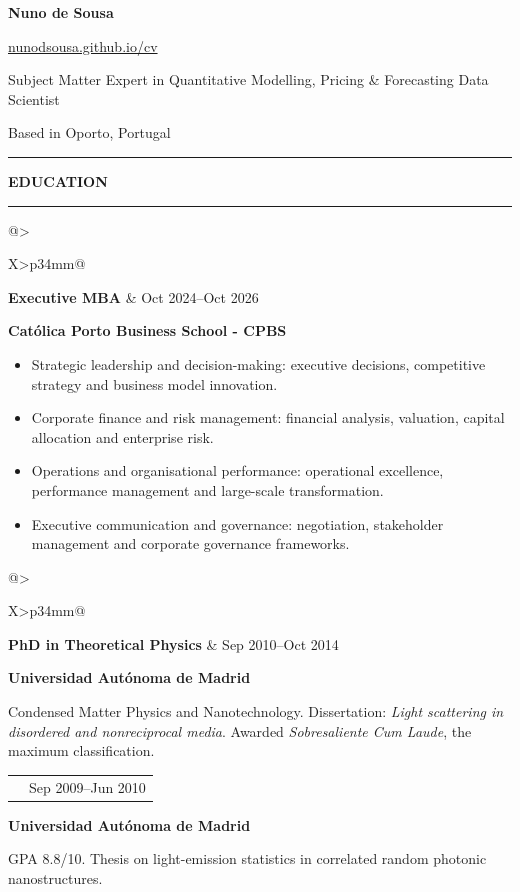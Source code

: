 \documentclass[9pt,a4paper]{extarticle}
\makeatletter
\newcommand{\cvsection}[1]{%
  \par\vspace{3.5mm}%
  {\color{accent}\bfseries\fontsize{10.2}{11.2}\selectfont\MakeUppercase{#1}}%
  \vspace{0.7mm}\par
  {\color{rulecolour}\rule{\linewidth}{0.45pt}}%
  \vspace{1.5mm}\par
}
\newcommand{\degree}[3]{%
  \begin{tabularx}{\linewidth}{@{}>{\raggedright\arraybackslash}X>{\raggedleft\arraybackslash}p{34mm}@{}}
    {\bfseries\color{ink}#1} & {\color{muted}#3} \\
  \end{tabularx}
  {\color{accent}\bfseries #2}\par
}
\makeatother
\begin{document}
\begin{minipage}[b]{0.36\textwidth}
  {\fontsize{17}{19}\selectfont\bfseries Nuno de Sousa}\par
  \href{https://nunodsousa.github.io/cv/}{nunodsousa.github.io/cv}
\end{minipage}\hfill
\begin{minipage}[b]{0.62\textwidth}
  \RaggedLeft
  {\fontsize{8.9}{10.3}\selectfont\color{secondary}Subject Matter Expert in Quantitative Modelling, Pricing \& Forecasting \textbar{} Data Scientist}\par
  {\color{muted}Based in Oporto, Portugal}
\end{minipage}\par
\vspace{1mm}
{\color{accent}\rule{\textwidth}{0.9pt}}

\cvsection{Education}

\degree{Executive MBA}{Cat\'olica Porto Business School - CPBS}{Oct 2024--Oct 2026}
\begin{itemize}
  \item Strategic leadership and decision-making: executive decisions, competitive strategy and business model innovation.
  \item Corporate finance and risk management: financial analysis, valuation, capital allocation and enterprise risk.
  \item Operations and organisational performance: operational excellence, performance management and large-scale transformation.
  \item Executive communication and governance: negotiation, stakeholder management and corporate governance frameworks.
\end{itemize}
\vspace{1mm}

\degree{PhD in Theoretical Physics}{Universidad Aut\'onoma de Madrid}{Sep 2010--Oct 2014}
Condensed Matter Physics and Nanotechnology. Dissertation: \emph{Light scattering in disordered and nonreciprocal media}. Awarded \emph{Sobresaliente Cum Laude}, the maximum classification.
\vspace{1.6mm}

\degree{Master in Photonics}{Universidad Aut\'onoma de Madrid}{Sep 2009--Jun 2010}
GPA 8.8/10. Thesis on light-emission statistics in correlated random photonic nanostructures.
\vspace{1.6mm}
\end{document}
